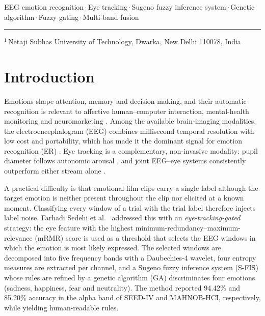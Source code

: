 \documentclass[10pt,twoside]{article}
\newcommand{\kw}{\,$\cdot$\,}
\begin{document}
\vspace{6pt}
{\raggedright{}\enspace EEG emotion recognition\kw Eye tracking\kw Sugeno fuzzy inference system\kw Genetic algorithm\kw Fuzzy gating\kw Multi-band fusion\par}

\vfill
\noindent\rule{0.35\linewidth}{0.4pt}\par
{\footnotesize
\noindent$^{1}$\,Netaji Subhas University of Technology, Dwarka, New Delhi 110078, India\par}
\clearpage

\section{Introduction}
Emotions shape attention, memory and decision-making, and their automatic recognition is relevant to affective human--computer interaction, mental-health monitoring and neuromarketing \cite{Alarcao2019,Kaya2024}. Among the available brain-imaging modalities, the electroencephalogram (EEG) combines millisecond temporal resolution with low cost and portability, which has made it the dominant signal for emotion recognition (ER) \cite{Jenke2014,ZhengLu2015}. Eye tracking is a complementary, non-invasive modality: pupil diameter follows autonomic arousal \cite{Bradley2008,Partala2003}, and joint EEG--eye systems consistently outperform either stream alone \cite{Lu2015,Zheng2019,Liu2022}.

A practical difficulty is that emotional film clips carry a single label although the target emotion is neither present throughout the clip nor elicited at a known moment. Classifying every window of a trial with the trial label therefore injects label noise. Farhadi Sedehi et al.\ \cite{FarhadiSedehi2024a} addressed this with an \emph{eye-tracking-gated} strategy: the eye feature with the highest minimum-redundancy--maximum-relevance (mRMR) score is used as a threshold that selects the EEG windows in which the emotion is most likely expressed. The selected windows are decomposed into five frequency bands with a Daubechies-4 wavelet, four entropy measures are extracted per channel, and a Sugeno fuzzy inference system (S-FIS) whose rules are refined by a genetic algorithm (GA) discriminates four emotions (sadness, happiness, fear and neutrality). The method reported 94.42\% and 85.20\% accuracy in the alpha band of SEED-IV and MAHNOB-HCI, respectively, while yielding human-readable rules.
\end{document}
